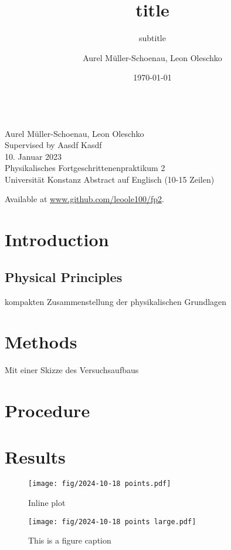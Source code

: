 \documentclass[
    parskip=half, 
    twoside=false,
    twocolumn=true,
    fontsize=11pt,
]{scrarticle}
\begin{document}
\title{title}
\subtitle{subtitle}
\author{Aurel Müller-Schoenau, Leon Oleschko}
\date{\dotdate\today}


\begin{titlepage}
    \sffamily
    \vspace*{3cm}
    {
        \fontsize{32}{32}
    }
    \vspace{.25cm}\\
    {
        \Large
        Aurel Müller-Schoenau, Leon Oleschko\\
        Supervised by Aasdf Kasdf
        \vspace{.05cm}\\
        10. Januar 2023
        \vspace{.25cm}\\
        \normalsize
        Physikalisches Fortgeschrittenenpraktikum 2\\
        Universität Konstanz
    }
    \vfill
    {
        \normalfont\normalsize
        Abstract auf Englisch (10-15 Zeilen)
        \blindtext[2]
    }
    \vfill
    \begin{flushright}
        Available at \url{www.github.com/leoole100/fp2}.
    \end{flushright}
\end{titlepage}

\section{Introduction}
\blindtext

\subsection{Physical Principles}
kompakten Zusammenstellung der physikalischen Grundlagen
\blindtext

\section{Methods}
Mit einer Skizze des Versuchsaufbaus
\blindtext[3]

\pagebreak
\section{Procedure}
\blindtext[5]

\pagebreak
\section{Results}
\begin{figure}[H]
    \centering
    \texttt{[image: fig/2024-10-18 points.pdf]}
    \caption{Inline plot}
\end{figure}
\begin{figure*}
    \centering \texttt{[image: fig/2024-10-18 points large.pdf]}
    \caption{This is a figure caption}
\end{figure*}
\blindtext[3]
\end{document}
